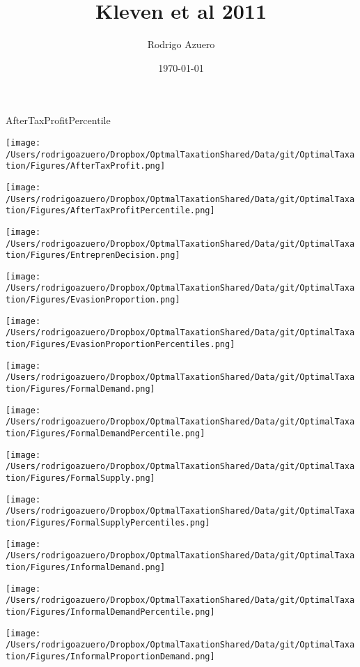 \documentclass[12pt]{article}
\title{\vspace{-3cm}Kleven et al 2011}
\author{Rodrigo Azuero}
\date{\today}
\begin{document}
\maketitle





\doublespacing
AfterTaxProfitPercentile


\texttt{[image: /Users/rodrigoazuero/Dropbox/OptmalTaxationShared/Data/git/OptimalTaxation/Figures/AfterTaxProfit.png]}

\texttt{[image: /Users/rodrigoazuero/Dropbox/OptmalTaxationShared/Data/git/OptimalTaxation/Figures/AfterTaxProfitPercentile.png]}

\texttt{[image: /Users/rodrigoazuero/Dropbox/OptmalTaxationShared/Data/git/OptimalTaxation/Figures/EntreprenDecision.png]}

\texttt{[image: /Users/rodrigoazuero/Dropbox/OptmalTaxationShared/Data/git/OptimalTaxation/Figures/EvasionProportion.png]}

\texttt{[image: /Users/rodrigoazuero/Dropbox/OptmalTaxationShared/Data/git/OptimalTaxation/Figures/EvasionProportionPercentiles.png]}

\texttt{[image: /Users/rodrigoazuero/Dropbox/OptmalTaxationShared/Data/git/OptimalTaxation/Figures/FormalDemand.png]}

\texttt{[image: /Users/rodrigoazuero/Dropbox/OptmalTaxationShared/Data/git/OptimalTaxation/Figures/FormalDemandPercentile.png]}

\texttt{[image: /Users/rodrigoazuero/Dropbox/OptmalTaxationShared/Data/git/OptimalTaxation/Figures/FormalSupply.png]}

\texttt{[image: /Users/rodrigoazuero/Dropbox/OptmalTaxationShared/Data/git/OptimalTaxation/Figures/FormalSupplyPercentiles.png]}

\texttt{[image: /Users/rodrigoazuero/Dropbox/OptmalTaxationShared/Data/git/OptimalTaxation/Figures/InformalDemand.png]}

\texttt{[image: /Users/rodrigoazuero/Dropbox/OptmalTaxationShared/Data/git/OptimalTaxation/Figures/InformalDemandPercentile.png]}

\texttt{[image: /Users/rodrigoazuero/Dropbox/OptmalTaxationShared/Data/git/OptimalTaxation/Figures/InformalProportionDemand.png]}
\end{document}
